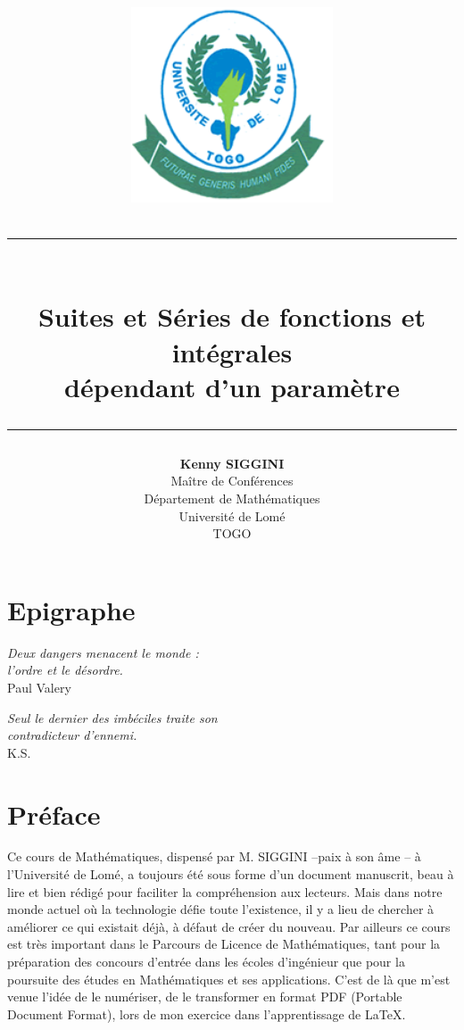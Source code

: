 \documentclass[11pt, a4paper]{book}
\author{\textbf{Kenny SIGGINI} \\ Ma\^itre de Conf\'erences \\ D\'epartement de Math\'ematiques \\Universit\'e de Lom\'e\\ TOGO}
\begin{document}
\title{ \begin{figure} \begin{center}
 \includegraphics[height=6cm,width=6cm]{logoul.png} \end{center} \end{figure}\rule{13cm}{0.15cm}\\ \textbf{\textbf{ Suites et S\'eries de fonctions et int\'egrales\\ d\'ependant d'un param\`etre}}\\ \rule{13cm
}{0.15cm}
}
 
\date{}

\maketitle
\chapter*{Epigraphe}
\begin{flushright}
\emph{ Deux dangers menacent le monde :\\ l'ordre et le d\'esordre.}\\ Paul Valery
\end{flushright}
\vspace{2cm}
\begin{flushright}
\emph{Seul le dernier des imb\'eciles traite son\\ contradicteur d'ennemi.}\\ K.S.
\end{flushright}
\chapter*{Préface}
Ce cours de Math\'ematiques, dispens\'e par M. SIGGINI --paix à son âme -- \`a l'Universit\'e de Lom\'e, a toujours \'et\'e sous forme d'un document manuscrit, beau \`a lire et bien r\'edig\'e pour faciliter la compr\'ehension aux lecteurs. Mais dans notre monde actuel o\`u la technologie d\'efie toute l'existence, il y a lieu de chercher \`a am\'eliorer ce qui existait d\'ej\`a, \`a d\'efaut de cr\'eer du nouveau. Par ailleurs ce cours est tr\`es important dans le Parcours de Licence de Math\'ematiques, tant pour la pr\'eparation des concours d'entr\'ee dans les \'ecoles d'ing\'enieur que pour la poursuite des \'etudes en Math\'ematiques et ses applications. C'est de l\`a que m'est venue l'id\'ee de le num\'eriser, de le transformer en format PDF (Portable Document Format), lors de mon exercice dans l'apprentissage de \LaTeX.\\
\end{document}
